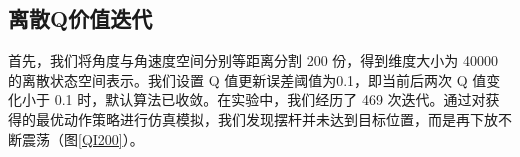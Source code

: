 \documentclass[conference,10pt]{IEEEtran}
\begin{document}
\subsection{离散Q价值迭代}
首先，我们将角度与角速度空间分别等距离分割 200 份，得到维度大小为 40000 的离散状态空间表示。我们设置 Q 值更新误差阈值为0.1，即当前后两次 Q 值变化小于 0.1 时，默认算法已收敛。在实验中，我们经历了 469 次迭代。通过对获得的最优动作策略进行仿真模拟，我们发现摆杆并未达到目标位置，而是再下放不断震荡（图\ref{QI200}）。

\begin{figure}[H]
	\centering
\centering
{}%


\end{figure}
\end{document}
